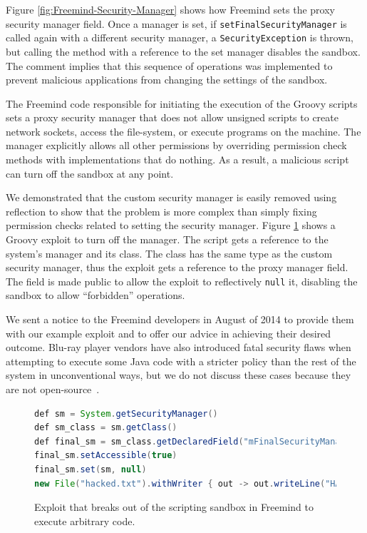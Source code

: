 \documentclass{sig-alternate}
\begin{document}
Figure \ref{fig:Freemind-Security-Manager} shows how Freemind sets
the proxy security manager field.
Once a manager is set, if \texttt{setFinalSecurityManager} is called
again with a different security manager, a \texttt{SecurityException}
is thrown, but calling the method with a reference to the set manager disables
the sandbox. The comment implies that this sequence
of operations was implemented to prevent malicious applications from
changing the settings of the sandbox.

The Freemind code responsible for initiating the execution of the
Groovy scripts sets a proxy security manager that does not allow unsigned
scripts to create network sockets, access the file-system, or execute
programs on the machine. The manager explicitly allows all other permissions by overriding permission check methods with implementations that do nothing. As a result, a malicious script can turn off the sandbox at any point.

We demonstrated that the custom security manager is easily removed
using reflection to show that the problem is more complex than simply
fixing permission checks related to setting the security manager. Figure \ref{fig:Example-Exploit-for-Freemind}
shows a Groovy exploit to turn off the manager. The script gets a reference to the system's manager
and its class. The class has the same type as the custom security
manager, thus the exploit gets a reference to the proxy manager field.
The field is made public to allow the exploit to reflectively \texttt{null}
it, disabling the sandbox to allow ``forbidden'' operations.

We sent a notice to the Freemind developers in August of 2014 to provide
them with our example exploit and to offer our advice in achieving
their desired outcome. Blu-ray player vendors have also introduced fatal security flaws when attempting to execute some Java code with a stricter policy than the rest of the system in unconventional ways, but we do not discuss these cases because they are not open-source~\cite{blu-ray}.

\begin{figure}
\begin{lstlisting}[language=Java,basicstyle={\scriptsize},breaklines=true]
def sm = System.getSecurityManager() 
def sm_class = sm.getClass() 
def final_sm = sm_class.getDeclaredField("mFinalSecurityManager")
final_sm.setAccessible(true) 
final_sm.set(sm, null)
new File("hacked.txt").withWriter { out -> out.writeLine("HACKED!") }
\end{lstlisting}
\caption{Exploit that breaks out of the scripting sandbox in Freemind\label{fig:Example-Exploit-for-Freemind}
to execute arbitrary code.}
\end{figure}
\end{document}
